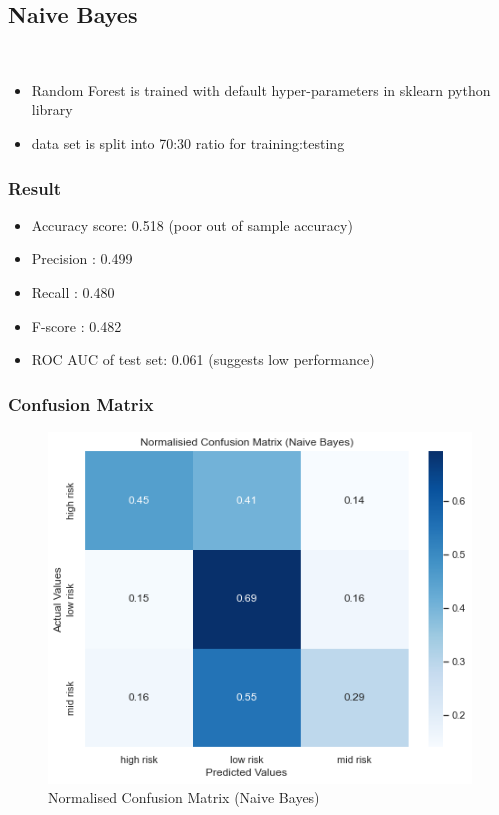 \documentclass[12pt, letter]{article}
\begin{document}
\subsection{Naive Bayes} \\ 
\begin{itemize}
    \item Random Forest is trained with default hyper-parameters in sklearn python library  
    \item data set is split into 70:30 ratio for training:testing 
\end{itemize}

\subsubsection{Result}
\begin{itemize}
    \item Accuracy score: 0.518 (poor out of sample accuracy)
    \item Precision : 0.499 
    \item Recall : 0.480 
    \item F-score : 0.482
    \item ROC AUC of test set: 0.061 (suggests low performance)
\end{itemize}

\subsubsection{Confusion Matrix}
\begin{figure}[h]
    \centering
    \includegraphics[scale = 0.5]{NB_CM.png}
    \caption{Normalised Confusion Matrix (Naive Bayes)}
    \label{RF_CM}
\end{figure}
\end{document}
